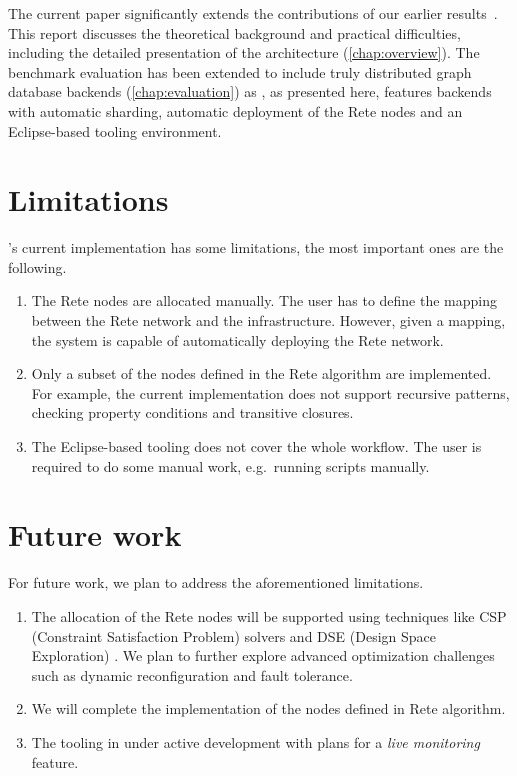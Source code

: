 The current paper significantly extends the contributions of our earlier results~\cite{Izso:2013:IIG:2487766.2487772}. This report discusses the theoretical background and practical difficulties, including the detailed presentation of the architecture (\autoref{chap:overview}). The benchmark evaluation has been extended to include truly distributed graph database backends (\autoref{chap:evaluation}) as \iqd, as presented here, features backends with automatic sharding, automatic deployment of the Rete nodes and an Eclipse-based tooling environment. 

\section{Limitations}

\iqd{}'s current implementation has some limitations, the most important ones are the following.

\begin{enumerate}
  \item The Rete nodes are allocated manually. The user has to define the mapping between the Rete network and the infrastructure. However, given a mapping, the system is capable of automatically deploying the Rete network.
  \item Only a subset of the nodes defined in the Rete algorithm are implemented. For example, the current implementation does not support recursive patterns, checking property conditions and transitive closures.
  \item The Eclipse-based tooling does not cover the whole workflow. The user is required to do some manual work, e.g.\ running scripts manually.
\end{enumerate}

\section{Future work}
\label{future-work}

For future work, we plan to address the aforementioned limitations.

\begin{enumerate}
  \item The allocation of the Rete nodes will be supported using techniques like CSP (Constraint Satisfaction Problem) solvers and DSE (Design Space Exploration) \cite{DSE11}. We plan to further explore advanced optimization challenges such as dynamic reconfiguration and fault tolerance.
  \item We will complete the implementation of the nodes defined in Rete algorithm.
  \item The tooling in under active development with plans for a \emph{live monitoring} feature.
\end{enumerate}

